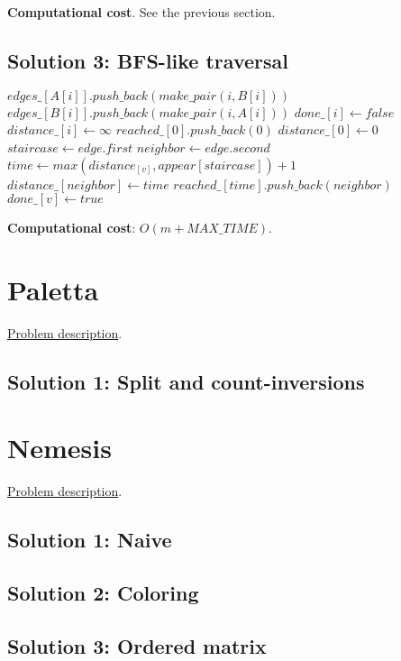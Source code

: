 \documentclass{article}
\begin{document}
\begin{framed}
  \noindent
  \textbf{Computational cost}. See the previous section.
\end{framed}

\subsection{Solution 3: BFS-like traversal}

\begin{algorithmic}[1]
          \State $edges\_[A[i]].push\_back(make\_pair(i, B[i]))$
          \State $edges\_[B[i]].push\_back(make\_pair(i, A[i]))$
      \EndFor
          \State $done\_[i] \gets false$
          \State $distance\_[i] \gets \infty$
      \EndFor
      \State $reached\_[0].push\_back(0)$
    \State $distance\_[0] \gets 0$
            \State $staircase \gets edge.first$
            \State $neighbor \gets edge.second$
            \State $time \gets max(distance_[v], appear[staircase])+1$
              \State $distance\_[neighbor] \gets time$
              \State $reached\_[time].push\_back(neighbor)$
            \EndIf
          \EndFor
        \State $done\_[v] \gets true$
          \EndIf
      \EndFor
    \EndFor
    \State {}
  \EndFunction
\end{algorithmic}

\begin{framed}
  \noindent
  \textbf{Computational cost}: $O(m + MAX\_TIME)$.
\end{framed}

\section{Paletta}
\href{http://didawiki.cli.di.unipi.it/lib/exe/fetch.php/magistraleinformatica/alg2/algo2_16/paletta.pdf}{Problem description}.
\subsection{Solution 1: Split and count-inversions}

\section{Nemesis}
\href{http://didawiki.cli.di.unipi.it/lib/exe/fetch.php/magistraleinformatica/alg2/algo2_16/nemesi.pdf}{Problem description}.
\subsection{Solution 1: Naive}

\subsection{Solution 2: Coloring}

\subsection{Solution 3: Ordered matrix}
\end{document}
